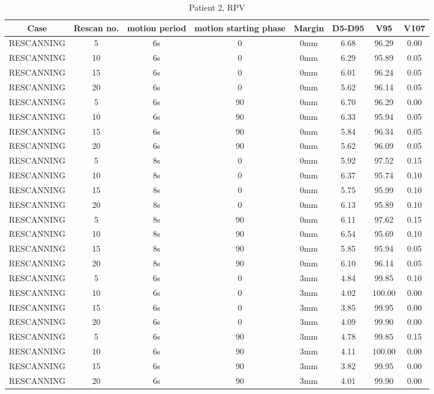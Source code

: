\begin{table}[H]
  \centering
   \scriptsize 
  \caption{Patient 2, RPV}
  \begin{tabular}{|c|c||c|c|c||c|c|c|}
    \hline\hline
    Case & Rescan no. & motion period & motion starting phase & Margin & D5-D95 & V95 & V107\\
    \hline 
RESCANNING & 5 & 6s & 0 & 0mm & 6.68 & 96.29 & 0.00 \\
RESCANNING & 10 & 6s & 0 & 0mm & 6.29 & 95.89 & 0.05 \\
RESCANNING & 15 & 6s & 0 & 0mm & 6.01 & 96.24 & 0.05 \\
RESCANNING & 20 & 6s & 0 & 0mm & 5.62 & 96.14 & 0.05 \\
RESCANNING & 5 & 6s & 90 & 0mm & 6.70 & 96.29 & 0.00 \\
RESCANNING & 10 & 6s & 90 & 0mm & 6.33 & 95.94 & 0.05 \\
RESCANNING & 15 & 6s & 90 & 0mm & 5.84 & 96.34 & 0.05 \\
RESCANNING & 20 & 6s & 90 & 0mm & 5.62 & 96.09 & 0.05 \\
RESCANNING & 5 & 8s & 0 & 0mm & 5.92 & 97.52 & 0.15 \\
RESCANNING & 10 & 8s & 0 & 0mm & 6.37 & 95.74 & 0.10 \\
RESCANNING & 15 & 8s & 0 & 0mm & 5.75 & 95.99 & 0.10 \\
RESCANNING & 20 & 8s & 0 & 0mm & 6.13 & 95.89 & 0.10 \\
RESCANNING & 5 & 8s & 90 & 0mm & 6.11 & 97.62 & 0.15 \\
RESCANNING & 10 & 8s & 90 & 0mm & 6.54 & 95.69 & 0.10 \\
RESCANNING & 15 & 8s & 90 & 0mm & 5.85 & 95.94 & 0.05 \\
RESCANNING & 20 & 8s & 90 & 0mm & 6.10 & 96.14 & 0.05 \\
RESCANNING & 5 & 6s & 0 & 3mm & 4.84 & 99.85 & 0.10 \\
RESCANNING & 10 & 6s & 0 & 3mm & 4.02 & 100.00 & 0.00 \\
RESCANNING & 15 & 6s & 0 & 3mm & 3.85 & 99.95 & 0.00 \\
RESCANNING & 20 & 6s & 0 & 3mm & 4.09 & 99.90 & 0.00 \\
RESCANNING & 5 & 6s & 90 & 3mm & 4.78 & 99.85 & 0.15 \\
RESCANNING & 10 & 6s & 90 & 3mm & 4.11 & 100.00 & 0.00 \\
RESCANNING & 15 & 6s & 90 & 3mm & 3.82 & 99.95 & 0.00 \\
RESCANNING & 20 & 6s & 90 & 3mm & 4.01 & 99.90 & 0.00 \\

\end{tabular}
\end{table}
